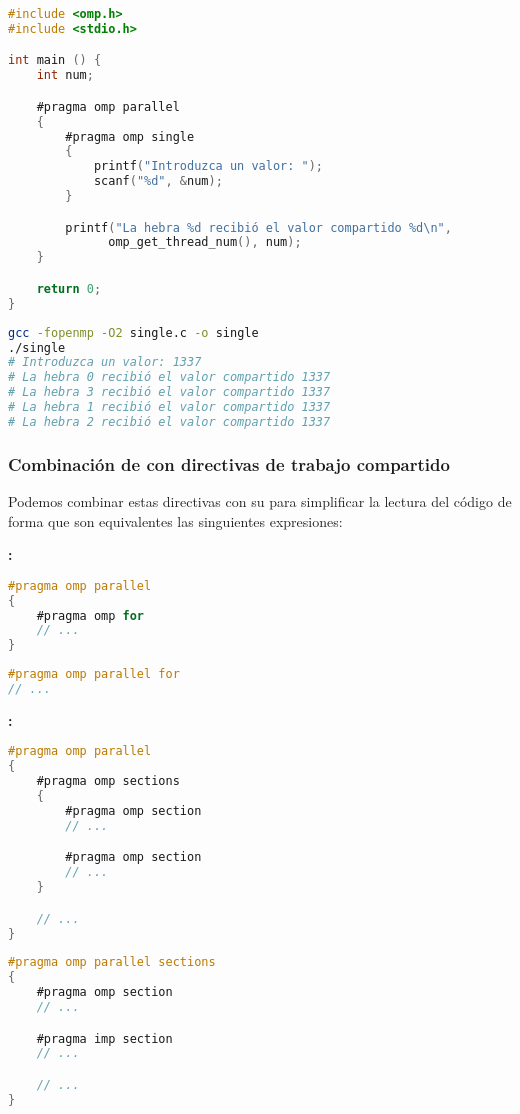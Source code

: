 \begin{lstlisting}[language=C]
#include <omp.h>
#include <stdio.h>

int main () {
	int num;

	#pragma omp parallel
	{
		#pragma omp single
		{
			printf("Introduzca un valor: ");
			scanf("%d", &num);
		}

		printf("La hebra %d recibió el valor compartido %d\n",
	          omp_get_thread_num(), num);
	}

	return 0;
}
\end{lstlisting}

\begin{lstlisting}[language=sh]
gcc -fopenmp -O2 single.c -o single
./single
# Introduzca un valor: 1337
# La hebra 0 recibió el valor compartido 1337
# La hebra 3 recibió el valor compartido 1337
# La hebra 1 recibió el valor compartido 1337
# La hebra 2 recibió el valor compartido 1337
\end{lstlisting}

\subsubsection{Combinación de  con directivas de trabajo compartido}

Podemos combinar estas directivas con su  para simplificar la lectura del código de forma que son equivalentes las singuientes expresiones:

\textbf{:}

\begin{lstlisting}[language=C]
#pragma omp parallel
{
	#pragma omp for
	// ...
}
\end{lstlisting}

\begin{lstlisting}[language=C]
#pragma omp parallel for
// ...
\end{lstlisting}

\textbf{:}

\begin{lstlisting}[language=C]
#pragma omp parallel
{
	#pragma omp sections
	{
		#pragma omp section
		// ...

		#pragma omp section
		// ...
	}

	// ...
}
\end{lstlisting}

\begin{lstlisting}[language=C]
#pragma omp parallel sections
{
	#pragma omp section
	// ...

	#pragma imp section
	// ...

	// ...
}
\end{lstlisting}

